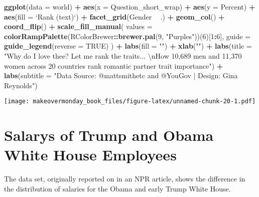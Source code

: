 \documentclass[]{book}
\newenvironment{Shaded}{\begin{snugshade}}{\end{snugshade}}
\newcommand{\KeywordTok}[1]{\textcolor[rgb]{0.13,0.29,0.53}{\textbf{#1}}}
\newcommand{\DataTypeTok}[1]{\textcolor[rgb]{0.13,0.29,0.53}{#1}}
\newcommand{\DecValTok}[1]{\textcolor[rgb]{0.00,0.00,0.81}{#1}}
\newcommand{\CharTok}[1]{\textcolor[rgb]{0.31,0.60,0.02}{#1}}
\newcommand{\StringTok}[1]{\textcolor[rgb]{0.31,0.60,0.02}{#1}}
\newcommand{\OtherTok}[1]{\textcolor[rgb]{0.56,0.35,0.01}{#1}}
\newcommand{\OperatorTok}[1]{\textcolor[rgb]{0.81,0.36,0.00}{\textbf{#1}}}
\newcommand{\NormalTok}[1]{#1}
\theoremstyle{definition}
\theoremstyle{definition}
\theoremstyle{definition}
\theoremstyle{remark}
\begin{document}
\begin{Shaded}
\begin{Highlighting}[]
\KeywordTok{ggplot}\NormalTok{(}\DataTypeTok{data =}\NormalTok{ world) }\OperatorTok{+}\StringTok{ }
\StringTok{  }\KeywordTok{aes}\NormalTok{(}\DataTypeTok{x =}\NormalTok{ Question_short_wrap) }\OperatorTok{+}
\StringTok{  }\KeywordTok{aes}\NormalTok{(}\DataTypeTok{y =}\NormalTok{ Percent) }\OperatorTok{+}
\StringTok{  }\KeywordTok{aes}\NormalTok{(}\DataTypeTok{fill =} \StringTok{`}\DataTypeTok{Rank (text)}\StringTok{`}\NormalTok{) }\OperatorTok{+}
\StringTok{  }\KeywordTok{facet_grid}\NormalTok{(Gender }\OperatorTok{~}\StringTok{ }\NormalTok{.) }\OperatorTok{+}
\StringTok{  }\KeywordTok{geom_col}\NormalTok{() }\OperatorTok{+}
\StringTok{  }\KeywordTok{coord_flip}\NormalTok{() }\OperatorTok{+}
\StringTok{  }\KeywordTok{scale_fill_manual}\NormalTok{(}
    \DataTypeTok{values =} \KeywordTok{colorRampPalette}\NormalTok{(RColorBrewer}\OperatorTok{::}\KeywordTok{brewer.pal}\NormalTok{(}\DecValTok{9}\NormalTok{, }\StringTok{"Purples"}\NormalTok{))(}\DecValTok{6}\NormalTok{)[}\DecValTok{1}\OperatorTok{:}\DecValTok{6}\NormalTok{],}
    \DataTypeTok{guide =} \KeywordTok{guide_legend}\NormalTok{(}\DataTypeTok{reverse =} \OtherTok{TRUE}\NormalTok{)}
\NormalTok{  ) }\OperatorTok{+}
\StringTok{  }\KeywordTok{labs}\NormalTok{(}\DataTypeTok{fill =} \StringTok{""}\NormalTok{) }\OperatorTok{+}
\StringTok{  }\KeywordTok{xlab}\NormalTok{(}\StringTok{""}\NormalTok{) }\OperatorTok{+}
\StringTok{  }\KeywordTok{labs}\NormalTok{(}\DataTypeTok{title =} \StringTok{"Why do I love thee?  Let me rank the traits... }\CharTok{\textbackslash{}n}\StringTok{How 10,689 men and 11,370 women across 20 countries rank romantic partner trait importance"}\NormalTok{) }\OperatorTok{+}
\StringTok{  }\KeywordTok{labs}\NormalTok{(}\DataTypeTok{subtitle =} \StringTok{"Data Source: @mattsmithetc and @YouGov | Design: Gina Reynolds"}\NormalTok{) }
\end{Highlighting}
\end{Shaded}

\texttt{[image: makeovermonday\_book\_files/figure-latex/unnamed-chunk-20-1.pdf]}

\chapter{Salarys of Trump and Obama White House
Employees}\label{salarys-of-trump-and-obama-white-house-employees}

The data set, originally reported on in an NPR article, shows the
difference in the distribution of salaries for the Obama and early Trump
White House.
\end{document}
